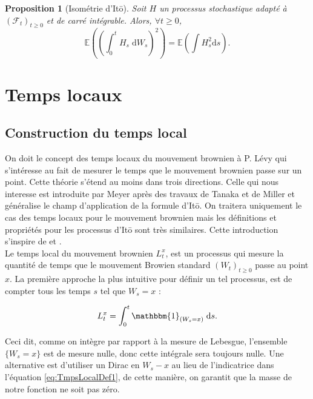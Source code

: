 \documentclass[openany]{book}
\newcommand{\F}{\mathscr{F}}
\newcommand{\E}{\mathbb{E}}
\newcommand{\1}{\mathbbm{1}}
\renewcommand{\d}{\mathrm{d}}
\theoremstyle{thmfont}
\theoremstyle{deffont}
\theoremstyle{thmfont}
\newtheorem{prop}[prop]{Proposition}
\theoremstyle{deffont}
\begin{document}
\begin{prop}[Isométrie d'Itō] Soit $H$ un processus stochastique adapté à $(\F_t)_{t\geq0}$ et de carré intégrable. Alors, $\forall t \geq 0$,
  \begin{equation}
    \E\left( \left(\int_0^t H_s \;\d W_s\right)^2\right) = \E\left( \int H_s^2 \d s\right).
  \end{equation}
  

  \end{prop}
\chapter{Temps locaux}

\section{Construction du temps local}\label{sec:ConstrTempsLoc}

On doit le concept des temps locaux du mouvement brownien à P. Lévy qui s’intéresse au fait de mesurer le temps que le mouvement brownien passe sur un point. Cette théorie s'étend au moins dans trois directions.
Celle qui nous interesse est introduite par Meyer après des travaux de Tanaka et de Miller et généralise le champ d'application de la formule d'Itō. On traitera uniquement le cas des temps locaux pour le mouvement brownien mais les définitions et propriétés pour les processus d'Itō sont très similaires. Cette introduction s'inspire de \cite{revuz-yor} et \cite{almostsure}.\\

Le temps local du mouvement brownien $L_t^x$, est un processus qui mesure la quantité de temps que le mouvement Browien standard $(W_t)_{t\geq0}$ passe au point $x$.
La première approche la plus intuitive pour définir un tel processus, est de compter tous les temps $s$ tel que $W_s = x$ :

\begin{equation}
  \label{eq:TmpsLocalDef1}
   L^x_t= \int_0^t\1_{(W_s=x)}\;\d s.
  \end{equation}

Ceci dit, comme on intègre par rapport à la mesure de Lebesgue, l'ensemble $\{W_s = x\}$ est de mesure nulle, donc cette intégrale sera toujours nulle. Une alternative est d'utiliser un Dirac en $W_s - x$ au lieu de l'indicatrice dans l'équation \eqref{eq:TmpsLocalDef1}, de cette manière, on garantit que la masse de notre fonction ne soit pas zéro.
\end{document}
